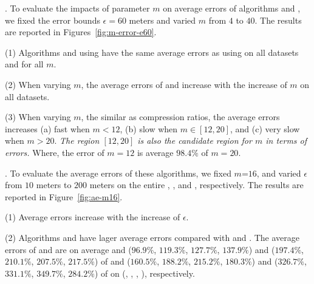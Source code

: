.
To evaluate the impacts of parameter $m$ on average errors of algorithms \cist and \cista, we fixed the error bounds {$\epsilon =60$ meters} and varied $m$ from $4$ to $40$.
The results are reported in Figures~\ref{fig:m-error-e60}.



\ni(1) Algorithms \cist and \cista using \rpia have the same average errors as using \cpia on all datasets and for all $m$.

\ni(2) When varying $m$, the average errors of \cist and \cista increase with the increase of $m$ on all datasets.

\ni(3) When varying $m$, the similar as compression ratios,
 the average errors increases (a) fast when $m < 12$, (b) slow when $m \in [12, 20]$, and (c) very slow when $m > 20$. \emph{The region $[12, 20]$ is also the candidate region for $m$ in terms of errors.} Where, the error of $m=12$ is average {$98.4\%$} of $m=20$.




.
To evaluate the average errors of these algorithms, we fixed {$m$=$16$}, and varied $\epsilon$ from $10$ meters to $200$ meters on the entire \truck, \sercar, \geolife and \pricar, respectively.
The results are reported in Figure~\ref{fig:ae-m16}.

\ni(1) Average errors increase with the increase of $\epsilon$.

\ni(2) Algorithms \cist and \cista have lager average errors compared with \dps and \squishe.
The average errors of \cist and \cista are on average and ($96.9\%$, $119.3\%$, $127.7\%$, $137.9\%$) and ($197.4\%$, $210.1\%$, $207.5\%$, $217.5\%$) of \dps and ($160.5\%$, $188.2\%$, $215.2\%$, {$180.3\%$}) and ($326.7\%$, $331.1\%$, $349.7\%$, {$284.2\%$}) of \squishe on (\truck, \sercar, \geolife, \pricar), respectively.

